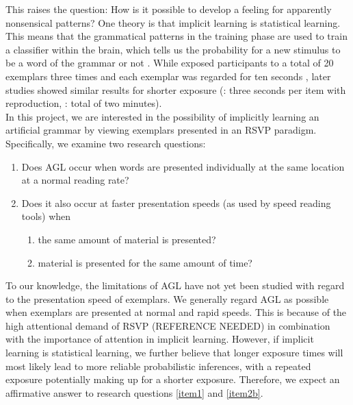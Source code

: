 This raises the question: How is it possible to develop a feeling for apparently nonsensical patterns? One theory is that implicit learning is statistical learning. This means that the grammatical patterns in the training phase are used to train a classifier within the brain, which tells us the probability for a new stimulus to be a word of the grammar or not \citep{perruchet2006implicit,saffran2002constraints}.
While \citeauthor{reber1967implicit} exposed participants to a total of 20 exemplars three times and each exemplar was regarded for ten seconds \citep{reber1978analogic}, later studies showed similar results for shorter exposure (\citet{knowlton1996artificial}: three seconds per item with reproduction, \citet{gomez1999artificial}: total of two minutes).\\
In this project, we are interested in the possibility of implicitly learning an artificial grammar by viewing exemplars presented in an RSVP paradigm. Specifically, we examine two research questions:
\begin{enumerate}
\item \label{item1}Does AGL occur when words are presented individually at the same location at a normal reading rate?
\item \label{item2}Does it also occur at faster presentation speeds (as used by speed reading tools) when
\begin{enumerate}
\item \label{item2a}the same amount of material is presented?
\item \label{item2b}material is presented for the same amount of time? 
\end{enumerate}
\end{enumerate}
To our knowledge, the limitations of AGL have not yet been studied with regard to the presentation speed of exemplars. We generally regard AGL as possible when exemplars are presented at normal and rapid speeds. This is because of the high attentional demand of RSVP (REFERENCE NEEDED) in combination with the importance of attention in implicit learning. However, if implicit learning is statistical learning, we further believe that longer exposure times will most likely lead to more reliable probabilistic inferences, with a repeated exposure potentially making up for a shorter exposure. Therefore, we expect an affirmative answer to research questions \ref{item1} and \ref{item2b}. 

